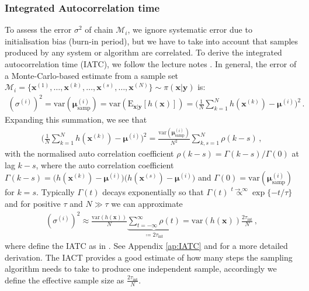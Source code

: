 \subsubsection{Integrated Autocorrelation time}
To assess the error $\sigma^2$ of chain $\mathcal{M}_i$, we ignore systematic error due to initialisation bias (burn-in period), but we have to take into account that samples produced by any system or algorithm are correlated.
To derive the integrated autocorrelation time (IATC), we follow the lecture notes \cite{wolff2002LecNot}.
In general, the error of a Monte-Carlo-based estimate from a sample set $\mathcal{M}_i = \{\bm{x}^{(1)}, \dots,\bm{x}^{(k)},\dots, \bm{x}^{(s)},\dots, \bm{x}^{(N)}\} \sim \pi(\bm{x}|\bm{y})$ is:
\begin{align}
	(\sigma^{(i)})^2 = \text{var}(\bm{\mu}^{(i)}_{\text{samp}} ) =  \text{var}(\text{E}_{\bm{x}|\bm{y}} [h(\bm{x})]) = \Bigg( \frac{1}{N} \sum_{k=1}^{N} h(\bm{x}^{(k)}) - \bm{\mu}^{(i)} \Bigg)^2 \, .
\end{align}
Expanding this summation, we see that
\begin{align}
	\Bigg( \frac{1}{N} \sum_{k=1}^{N} h(\bm{x}^{(k)}) - \bm{\mu}^{(i)} \Bigg)^2  =  \frac{\text{var}(\bm{\mu}^{(i)}_{\text{samp}}) }{N^2} \sum_{k,s=1}^{N}\rho(k-s)\, ,
\end{align}
with the normalised auto correlation coefficient $\rho(k-s) =  \Gamma(k-s)/ \Gamma(0)$ at lag $k-s$, where the auto correlation coefficient $\Gamma(k-s) =  \big( h(\bm{x}^{(k)}) - \bm{\mu}^{(i)} \big) \big(h(\bm{x}^{(s)}) - \bm{\mu}^{(i)} \big)$ and  $\Gamma(0) = \text{var}(\bm{\mu}^{(i)}_{\text{samp}} )$ for $k=s$.
Typically $\Gamma(t)$ decays exponentially so that $\Gamma(t) \overset{t \rightarrow \infty }{ \propto} \exp\{ - t / \tau \}  $ and for positive $\tau$ and $N\gg \tau$ we can approximate
\begin{align}
	(\sigma^{(i)})^2   \approx  \frac{\text{var}(h(\bm{x}) )}{N} \underbrace{\sum_{t = - \infty }^{\infty} \rho(t)}_{ \coloneqq 	2\tau_{\text{int}} } = \text{var}(h(\bm{x})) \frac{ 2 \tau_{\text{int}} }{N} \, , \label{eq:MCerr}
\end{align}
where define the IATC as in \cite[pp. 103-105]{wolff2002LecNot}.
See Appendix \ref{ap:IATC} and \cite{Sokal1997} for a more detailed derivation.
The IACT provides a good estimate of how many steps the sampling algorithm needs to take to produce one independent sample, accordingly we define the effective sample size as $\frac{ 2 \tau_{\text{int}} }{N}$.

